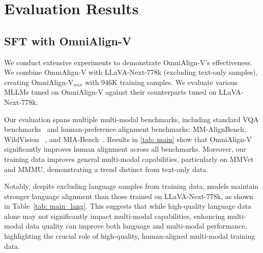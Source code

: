 \section{Evaluation Results}

\subsection{SFT with OmniAlign-V }

We conduct extensive experiments to demonstrate OmniAlign-V's effectiveness. 
We combine OmniAlign-V with LLaVA-Next-778k (excluding text-only samples), 
creating OmniAlign-V$_{mix}$ with 946K training samples. 
We evaluate various MLLMs tuned on OmniAlign-V against their counterparts tuned on LLaVA-Next-778k.

Our evaluation spans multiple multi-modal benchmarks, 
including standard VQA benchmarks~\cite{yu2023mm,liu2024mmbench,liu2023hidden,yue2023mmmu,kembhavi2016diagram} and human-preference alignment benchmarks: MM-AlignBench, WildVision ~\cite{lu2024wildvision}, and MIA-Bench~\cite{qian2024mia}. 
Results in \cref{tab: main} show that OmniAlign-V significantly improves human alignment across all benchmarks. 
Moreover, our training data improves general multi-modal capabilities, particularly on MMVet and MMMU, demonstrating a trend distinct from text-only data. 

Notably, despite excluding language samples from training data, models maintain stronger language alignment than those trained on LLaVA-Next-778k, as shown in Table~\ref{tab: main_lang}. 
This suggests that while high-quality language data alone may not significantly impact multi-modal capabilities, 
enhancing multi-modal data quality can improve both language and multi-modal performance, highlighting the crucial role of high-quality, human-aligned multi-modal training data.



